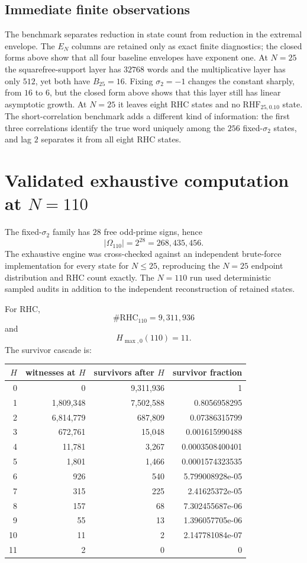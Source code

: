 \documentclass[11pt]{article}
\newcommand{\RHC}{\mathrm{RHC}}
\newcommand{\RHF}{\mathrm{RHF}}
\begin{document}
\subsection{Immediate finite observations}
The benchmark separates reduction in state count from reduction in the extremal envelope. The $E_N$ columns are retained only as exact finite diagnostics; the closed forms above show that all four baseline envelopes have exponent one. At $N=25$ the squarefree-support layer has $32768$ words and the multiplicative layer has only $512$, yet both have $B_{25}=16$. Fixing $\sigma_2=-1$ changes the constant sharply, from $16$ to $6$, but the closed form above shows that this layer still has linear asymptotic growth. At $N=25$ it leaves eight RHC states and no $\RHF_{25,0.10}$ state. The short-correlation benchmark adds a different kind of information: the first three correlations identify the true word uniquely among the $256$ fixed-$\sigma_2$ states, and lag $2$ separates it from all eight RHC states.




\section{Validated exhaustive computation at $N=110$}

The fixed-$\sigma_2$ family has $28$ free odd-prime signs, hence
\[
 |\Omega_{110}|=2^{28}=268{,}435{,}456.
\]
The exhaustive engine was cross-checked against an independent brute-force implementation for every state for $N\le25$, reproducing the $N=25$ endpoint distribution and RHC count exactly.  The $N=110$ run used deterministic sampled audits in addition to the independent reconstruction of retained states.

For RHC,
\[
 \boxed{\#\RHC_{110}=9{,}311{,}936}
\]
and
\[
 \boxed{H_{\max,0}(110)=11.}
\]
The survivor cascade is:
\begin{center}\small
\begin{tabular}{r r r r}
\toprule $H$ & witnesses at $H$ & survivors after $H$ & survivor fraction\\
\midrule
0 & 0 & 9{,}311{,}936 & 1\\
1 & 1{,}809{,}348 & 7{,}502{,}588 & 0.8056958295\\
2 & 6{,}814{,}779 & 687{,}809 & 0.07386315799\\
3 & 672{,}761 & 15{,}048 & 0.001615990488\\
4 & 11{,}781 & 3{,}267 & 0.0003508400401\\
5 & 1{,}801 & 1{,}466 & 0.0001574323535\\
6 & 926 & 540 & 5.799008928e-05\\
7 & 315 & 225 & 2.41625372e-05\\
8 & 157 & 68 & 7.302455687e-06\\
9 & 55 & 13 & 1.396057705e-06\\
10 & 11 & 2 & 2.147781084e-07\\
11 & 2 & 0 & 0\\
\bottomrule\end{tabular}
\end{center}
\end{document}

